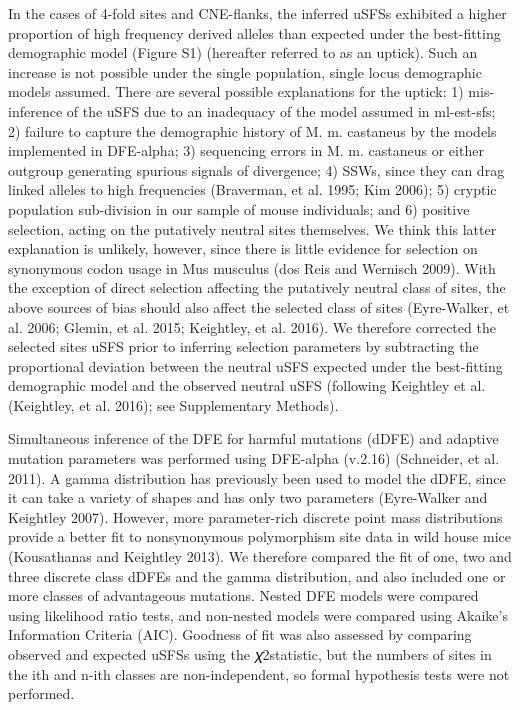 In the cases of 4-fold sites and CNE-flanks, the inferred uSFSs exhibited a higher proportion of high frequency derived alleles than expected under the best-fitting demographic model (Figure S1) (hereafter referred to as an uptick). Such an increase is not possible under the single population, single locus demographic models assumed. There are several possible explanations for the uptick: 1) mis-inference of the uSFS due to an inadequacy of the model assumed in ml-est-sfs; 2) failure to capture the demographic history of M. m. castaneus by the models implemented in DFE-alpha; 3) sequencing errors in M. m. castaneus or either outgroup generating spurious signals of divergence; 4) SSWs, since they can drag linked alleles to high frequencies (Braverman, et al. 1995; Kim 2006); 5) cryptic population sub-division in our sample of mouse individuals; and 6) positive selection, acting on the putatively neutral sites themselves. We think this latter explanation is unlikely, however, since there is little evidence for selection on synonymous codon usage in Mus musculus (dos Reis and Wernisch 2009). With the exception of direct selection affecting the putatively neutral class of sites, the above sources of bias should also affect the selected class of sites (Eyre-Walker, et al. 2006; Glemin, et al. 2015; Keightley, et al. 2016). We therefore corrected the selected sites uSFS prior to inferring selection parameters by subtracting the proportional deviation between the neutral uSFS expected under the best-fitting demographic model and the observed neutral uSFS (following Keightley et al. (Keightley, et al. 2016); see Supplementary Methods). 
 
Simultaneous inference of the DFE for harmful mutations (dDFE) and adaptive mutation parameters was performed using DFE-alpha (v.2.16) (Schneider, et al. 2011). A gamma distribution has previously been used to model the dDFE, since it can take a variety of shapes and has only two parameters (Eyre-Walker and Keightley 2007). However, more parameter-rich discrete point mass distributions provide a better fit to nonsynonymous polymorphism site data in wild house mice (Kousathanas and Keightley 2013). We therefore compared the fit of one, two and three discrete class dDFEs and the gamma distribution, and also included one or more classes of advantageous mutations. Nested DFE models were compared using likelihood ratio tests, and non-nested models were compared using Akaike’s Information Criteria (AIC). Goodness of fit was also assessed by comparing observed and expected uSFSs using the 𝜒2­statistic, but the numbers of sites in the ith and n-ith classes are non-independent, so formal hypothesis tests were not performed.

